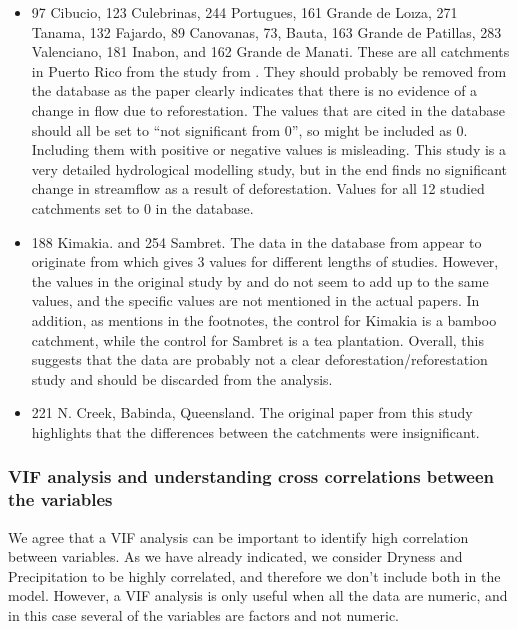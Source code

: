 \documentclass[]{elsarticle} %
\providecommand{\tightlist}{%
  \setlength{\itemsep}{0pt}\setlength{\parskip}{0pt}}
\begin{document}
\begin{itemize}
\tightlist
\item
  97 Cibucio, 123 Culebrinas, 244 Portugues, 161 Grande de Loıza, 271 Tanama, 132 Fajardo, 89 Canovanas, 73, Bauta, 163 Grande de Patillas, 283 Valenciano, 181 Inabon, and 162 Grande de Manati. These are all catchments in Puerto Rico from the study from \citet{beck2013}. They should probably be removed from the database as the paper clearly indicates that there is no evidence of a change in flow due to reforestation. The values that are cited in the database should all be set to ``not significant from 0'', so might be included as 0. Including them with positive or negative values is misleading. This study is a very detailed hydrological modelling study, but in the end finds no significant change in streamflow as a result of deforestation. Values for all 12 studied catchments set to 0 in the database.\\
\item
  188 Kimakia. and 254 Sambret. The data in the database from \citet{zhang2017} appear to originate from \citet{bruijnzeel1990} which gives 3 values for different lengths of studies. However, the values in the original study by \citet{blackie1979kimakia} and \citet{blackie1979kericho} do not seem to add up to the same values, and the specific values are not mentioned in the actual papers. In addition, as \citet{bruijnzeel1990} mentions in the footnotes, the control for Kimakia is a bamboo catchment, while the control for Sambret is a tea plantation. Overall, this suggests that the data are probably not a clear deforestation/reforestation study and should be discarded from the analysis.
\item
  221 N. Creek, Babinda, Queensland. The original paper from this study highlights that the differences between the catchments were insignificant.
\end{itemize}

\hypertarget{vif-analysis-and-understanding-cross-correlations-between-the-variables}{%
\subsubsection{VIF analysis and understanding cross correlations between the variables}\label{vif-analysis-and-understanding-cross-correlations-between-the-variables}}

We agree that a VIF analysis can be important to identify high correlation between variables. As we have already indicated, we consider Dryness and Precipitation to be highly correlated, and therefore we don't include both in the model. However, a VIF analysis is only useful when all the data are numeric, and in this case several of the variables are factors and not numeric.
\end{document}
